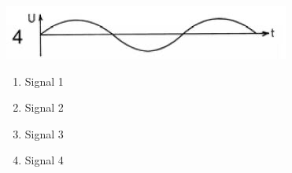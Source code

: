 \documentclass[8pt]{article}
\begin{document}
\begin{enumerate}
\begin{enumerate}[nolistsep,label=\Alph*]
\begin{center}
\begin{minipage}{\linewidth}
	\end{minipage}
\end{center}
\begin{center}
	\begin{minipage}{\linewidth}
		\centering
		\includegraphics[scale=1.0]{pics/td503_e.jpg}
	\end{minipage}
\end{center}
\begin{enumerate}[nolistsep,label=\Alph*]
\item Signal 1
\item Signal 2
\item Signal 3
\item Signal 4
\end{enumerate}


\end{enumerate}
\end{enumerate}
\end{document}
